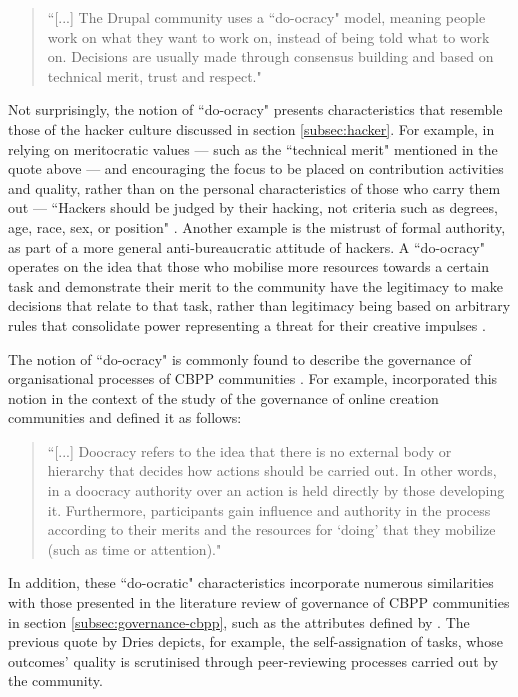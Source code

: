 \begin{quotation}
``[...] The Drupal community uses a ``do-ocracy" model, meaning people work on what they want to work on, instead of being told what to work on. Decisions are usually made through consensus building and based on technical merit, trust and respect."
\end{quotation}

Not surprisingly, the notion of ``do-ocracy" presents characteristics that resemble those of the hacker culture discussed in section \ref{subsec:hacker}. For example, in relying on meritocratic values --- such as the ``technical merit" mentioned in the quote above --- and encouraging the focus to be placed on contribution activities and quality, rather than on the personal characteristics of those who carry them out --- ``Hackers should be judged by their hacking, not criteria such as degrees, age, race, sex, or position" \parencite[35]{levy1984hackers}. Another example is the mistrust of formal authority, as part of a more general anti-bureaucratic attitude of hackers. A ``do-ocracy" operates on the idea that those who mobilise more resources towards a certain task and demonstrate their merit to the community have the legitimacy to make decisions that relate to that task, rather than legitimacy being based on arbitrary rules that consolidate power representing a threat for their creative impulses \parencite[25]{levy1984hackers}.

The notion of ``do-ocracy" is commonly found to describe the governance of organisational processes of CBPP communities \parencite[e.g.][]{mateos2008institutions, fuster2010governance, zacchiroli2011debian, kostakis2014production}. For example, \textcite[282]{fuster2010governance} incorporated this notion in the context of the study of the governance of online creation communities and defined it as follows:

\begin{quotation}
``[...] Doocracy refers to the idea that there is no external body or hierarchy that decides how actions should be carried out. In other words, in a doocracy authority over an action is held directly by those developing it. Furthermore, participants gain influence and authority in the process according to their merits and the resources for `doing' that they mobilize (such as time or attention)."
\end{quotation}

In addition, these ``do-ocratic" characteristics incorporate numerous similarities with those presented in the literature review of governance of CBPP communities in section \ref{subsec:governance-cbpp}, such as the attributes defined by \textcite{benkler2006commons}. The previous quote by Dries depicts, for example, the self-assignation of tasks, whose outcomes' quality is scrutinised through peer-reviewing processes carried out by the community.


